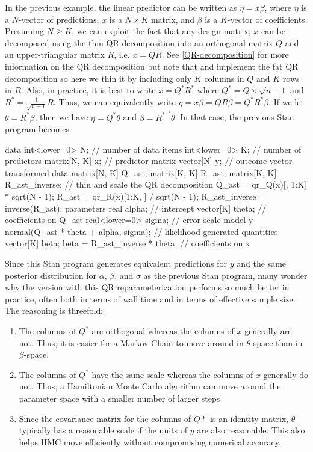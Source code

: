In the previous example, the linear predictor can be written as
$\eta = x \beta$, where $\eta$ is a $N$-vector of predictions,
$x$ is a $N \times K$ matrix, and $\beta$ is a $K$-vector of coefficients.
Presuming $N \geq K$, we can exploit the fact that any design matrix, $x$
can be decomposed using the thin QR decomposition into an orthogonal matrix
$Q$ and an upper-triangular matrix $R$, i.e. $x = Q R$. See \ref{QR-decomposition}
for more information on the QR decomposition but note that  and
 implement the fat QR decomposition so here we thin it by including
only $K$ columns in $Q$ and $K$ rows in $R$. Also, in practice, it is best to
write $x = Q^\ast R^\ast$ where $Q^\ast = Q \times \sqrt{n - 1}$ and
$R^\ast = \frac{1}{\sqrt{n - 1}} R$. Thus, we can equivalently write
$\eta = x \beta = Q R \beta = Q^\ast R^\ast \beta$. If we let
$\theta = R^\ast \beta$, then we have $\eta = Q^\ast \theta$ and
$\beta = R^{\ast^{-1}} \theta$. In that case, the previous Stan program becomes
%
\begin{stancode}
data {
  int<lower=0> N;   // number of data items
  int<lower=0> K;   // number of predictors
  matrix[N, K] x;   // predictor matrix
  vector[N] y;      // outcome vector
}
transformed data {
  matrix[N, K] Q_ast;
  matrix[K, K] R_ast;
  matrix[K, K] R_ast_inverse;
  // thin and scale the QR decomposition
  Q_ast = qr_Q(x)[, 1:K] * sqrt(N - 1);
  R_ast = qr_R(x)[1:K, ] / sqrt(N - 1);
  R_ast_inverse = inverse(R_ast);
}
parameters {
  real alpha;           // intercept
  vector[K] theta;      // coefficients on Q_ast
  real<lower=0> sigma;  // error scale
}
model {
  y ~ normal(Q_ast * theta + alpha, sigma);  // likelihood
}
generated quantities {
  vector[K] beta;
  beta = R_ast_inverse * theta; // coefficients on x
}
\end{stancode}
%
Since this Stan program generates equivalent predictions for $y$ and
the same posterior distribution for $\alpha$, $\beta$, and $\sigma$ as
the previous Stan program, many wonder why the version with this QR
reparameterization performs so much better in practice, often both in
terms of wall time and in terms of effective sample size. The
reasoning is threefold:
%
\begin{enumerate}
\item The columns of $Q^\ast$ are orthogonal whereas the columns of
  $x$ generally are not. Thus, it is easier for a Markov Chain to move
  around in $\theta$-space than in $\beta$-space.
\item The columns of $Q^\ast$ have the same scale whereas the columns
  of $x$ generally do not. Thus, a Hamiltonian Monte Carlo algorithm
  can move around the parameter space with a smaller number of larger
  steps
\item Since the covariance matrix for the columns of $Q\ast$ is an
  identity matrix, $\theta$ typically has a reasonable scale if the
  units of $y$ are also reasonable. This also helps HMC move
  efficiently without compromising numerical accuracy.
\end{enumerate}
